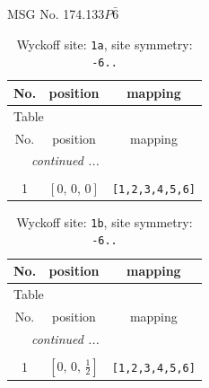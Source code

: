 \documentclass[fleqn,8pt]{jsarticle}
\begin{document}
\setcounter{MaxMatrixCols}{32}

\renewcommand{\tablename}{Table~}
\renewcommand{\figurename}{Figure~}
\begin{center}
\LARGE
MSG No. 174.133\quad$P\bar{6}$
\end{center}
\renewcommand{\arraystretch}{1.2}
\begin{longtable}{ccc}
\caption{Wyckoff site: {\tt 1a}, site symmetry: {\tt -6..}}
 \\
 \hline \hline
No. & position & mapping \\ \hline \endfirsthead

\multicolumn{2}{l}{\tablename\ \thetable{}} \\
 \hline \hline
No. & position & mapping \\ \hline \endhead

 \hline \hline
\multicolumn{2}{r}{\footnotesize\it continued ...} \\ \endfoot

 \hline \hline
\multicolumn{2}{r}{} \\ \endlastfoot

1 & $\left[ 0,\, 0,\, 0 \right]$ & {\tt [1,2,3,4,5,6]} \\
\end{longtable}
\renewcommand{\arraystretch}{1.2}
\begin{longtable}{ccc}
\caption{Wyckoff site: {\tt 1b}, site symmetry: {\tt -6..}}
 \\
 \hline \hline
No. & position & mapping \\ \hline \endfirsthead

\multicolumn{2}{l}{\tablename\ \thetable{}} \\
 \hline \hline
No. & position & mapping \\ \hline \endhead

 \hline \hline
\multicolumn{2}{r}{\footnotesize\it continued ...} \\ \endfoot

 \hline \hline
\multicolumn{2}{r}{} \\ \endlastfoot

1 & $\left[ 0,\, 0,\, \frac{1}{2} \right]$ & {\tt [1,2,3,4,5,6]} \\
\end{longtable}
\renewcommand{\arraystretch}{1.2}
\end{document}
